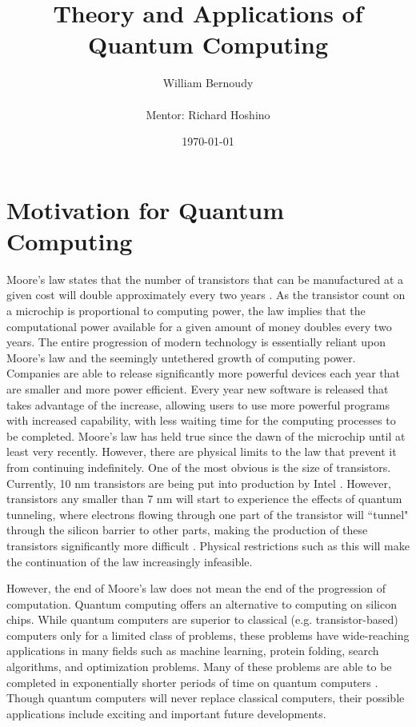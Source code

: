 \documentclass[11pt]{report}
\title{\textbf{Theory and Applications of Quantum Computing}}
\author{William Bernoudy\\ \\
		Mentor: Richard Hoshino}
\date{\today}
\newcommand{\?}{\stackrel{?}{=}}
\begin{document}
\maketitle

\setcounter{tocdepth}{1}
\tableofcontents

\chapter{Motivation for Quantum Computing}

Moore’s law states that the number of transistors that can be manufactured at a given cost will double approximately every two years \cite{moo65}. As the transistor count on a microchip is proportional to computing power, the law implies that the computational power available for a given amount of money doubles every two years. The entire progression of modern technology is essentially reliant upon Moore's law and the seemingly untethered growth of computing power. Companies are able to release significantly more powerful devices each year that are smaller and more power efficient. Every year new software is released that takes advantage of the increase, allowing users to use more powerful programs with increased capability, with less waiting time for the computing processes to be completed. Moore's law has held true since the dawn of the microchip until at least very recently. However, there are physical limits to the law that prevent it from continuing indefinitely. One of the most obvious is the size of transistors. Currently, 10 nm transistors are being put into production by Intel \cite{Sim16}. However, transistors any smaller than 7 nm will start to experience the effects of quantum tunneling, where electrons flowing through one part of the transistor will ``tunnel" through the silicon barrier to other parts, making the production of these transistors significantly more difficult \cite{Kha15}. Physical restrictions such as this will make the continuation of the law increasingly infeasible. 

However, the end of Moore’s law does not mean the end of the progression of computation. Quantum computing offers an alternative to computing on silicon chips. While quantum computers are superior to classical (e.g. transistor-based) computers only for a limited class of problems, these problems have wide-reaching applications in many fields such as machine learning, protein folding, search algorithms, and optimization problems. Many of these problems are able to be completed in exponentially shorter periods of time on quantum computers \cite{apps14}. Though quantum computers will never replace classical computers, their possible applications include exciting and important future developments.
\end{document}
